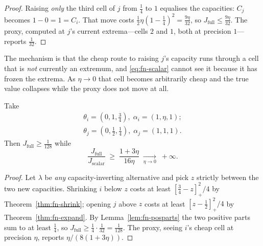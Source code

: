 \begin{proof}
Raising \emph{only} the third cell of $j$ from $\tfrac14$ to $1$ equalises the capacities:
$C_{j}$ becomes $1-0=1=C_{i}$. That move costs
$\tfrac12\eta(1-\tfrac14)^{2}=\tfrac{9\eta}{32}$, so
$J_{\mathrm{full}}\le\tfrac{9\eta}{32}$. The proxy, computed at $j$'s current extrema---cells
$2$ and $1$, both at precision $1$---reports $\tfrac{1}{32}$.
\end{proof}


The mechanism is that the cheap route to raising $j$'s capacity runs through a cell that is
\emph{not} currently an extremum, and \eqref{eq:fn-scalar} cannot see it because it has frozen
the extrema. As $\eta\to0$ that cell becomes arbitrarily cheap and the true value collapses
while the proxy does not move at all.

\begin{theorem}
\label{thm:fn-family2}
Take
\begin{align}
\theta_{i}=(0,1,\tfrac34),\;\alpha_{i}=(1,\eta,1);\\
\theta_{j}=(0,\tfrac12,\tfrac14),\;\alpha_{j}=(1,1,1).
\end{align}
Then $J_{\mathrm{full}}\ge\tfrac{1}{128}$ while
\begin{equation}
\frac{J_{\mathrm{full}}}{J_{\mathrm{scalar}}}
\;\geq\;\frac{1+3\eta}{16\eta}
\;\xrightarrow[\eta\to0]{}\;+\infty .
\label{eq:fn-family2}
\end{equation}
\end{theorem}

\begin{proof}
Let $\lambda$ be \emph{any} capacity-inverting alternative and pick $z$ strictly between the
two new capacities. Shrinking $i$ below $z$ costs at least $[\tfrac34-z]_{+}^{2}/4$ by
Theorem~\ref{thm:fn-shrink}; opening $j$ above $z$ costs at least $[z-\tfrac12]_{+}^{2}/4$ by
Theorem~\ref{thm:fn-expand}. By Lemma~\ref{lem:fn-posparts} the two positive parts sum to at least
$\tfrac14$, so $J_{\mathrm{full}}\ge\tfrac14\cdot\tfrac{1}{32}=\tfrac{1}{128}$. The proxy,
seeing $i$'s cheap cell at precision $\eta$, reports $\eta/(8(1+3\eta))$.
\end{proof}


